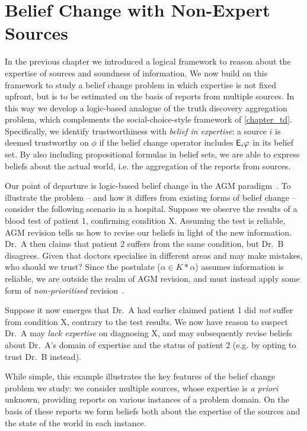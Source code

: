 \chapter{Belief Change with Non-Expert Sources}
\label{chapter_belief_change}

In the previous chapter we introduced a logical framework to reason about the
expertise of sources and soundness of information. We now build on this
framework to study a belief change problem in which expertise is not fixed
upfront, but is to be estimated on the basis of reports from multiple sources.
In this way we develop a logic-based analogue of the truth discovery
aggregation problem, which complements the social-choice-style framework of
\cref{chapter_td}. Specifically, we identify trustworthiness with \emph{belief
in expertise}: a source $i$ is deemed trustworthy on $\phi$ if the belief
change operator includes $\mathsf{E}_i\varphi$ in its belief set. By also including
propositional formulas in belief sets, we are able to express beliefs about the
actual world, i.e. the aggregation of the reports from sources.

Our point of departure is logic-based belief change in the AGM
paradigm~\cite{alchourron1985logic}.  To illustrate the problem -- and how it
differs from existing forms of belief change -- consider the following scenario
in a hospital. Suppose we observe the results of a blood test of patient 1,
confirming condition X. Assuming the test is reliable, AGM revision tells us
how to revise our beliefs in light of the new information. Dr.\ A then claims
that patient 2 suffers from the same condition, but Dr.\ B disagrees. Given
that doctors specialise in different areas and may make mistakes, who should we
trust?
%
Since the  postulate ($\alpha \in K \ast \alpha$) assumes
information is reliable, we are outside the realm of AGM revision, and must
instead apply some form of \emph{non-prioritised}
revision~\cite{hansson1999survey}.

Suppose it now emerges that Dr.\ A had earlier claimed patient 1 did \emph{not}
suffer from condition X, contrary to the test results. We now have reason to
suspect Dr.\ A may \emph{lack expertise} on diagnosing X, and may subsequently
revise beliefs about Dr.\ A's domain of expertise and the status of patient
2 (e.g. by opting to trust Dr.\ B instead).

While simple, this example illustrates the key features of the belief change
problem we study: we consider multiple sources, whose expertise is \emph{a
priori} unknown, providing reports on various instances of a problem domain. On
the basis of these reports we form beliefs both about the expertise of the
sources and the state of the world in each instance.

